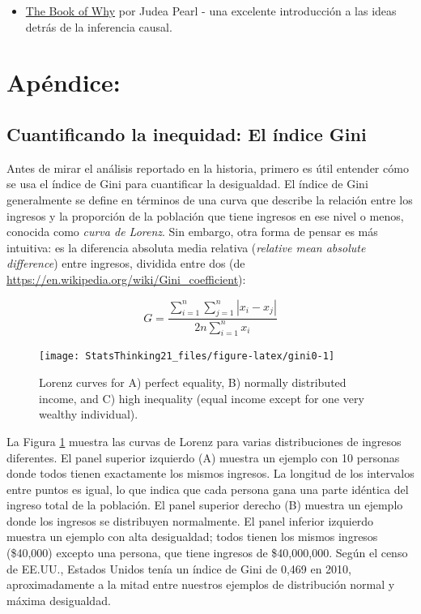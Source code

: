 \documentclass[
  12pt,
]{book}
\providecommand{\tightlist}{%
  \setlength{\itemsep}{0pt}\setlength{\parskip}{0pt}}
\begin{document}
\begin{itemize}
\tightlist
\item
  \href{http://bayes.cs.ucla.edu/WHY/}{The Book of Why} por Judea Pearl - una excelente introducción a las ideas detrás de la inferencia causal.
\end{itemize}

\hypertarget{apuxe9ndice-4}{%
\section{Apéndice:}\label{apuxe9ndice-4}}

\hypertarget{cuantificando-la-inequidad-el-uxedndice-gini}{%
\subsection{Cuantificando la inequidad: El índice Gini}\label{cuantificando-la-inequidad-el-uxedndice-gini}}

Antes de mirar el análisis reportado en la historia, primero es útil entender cómo se usa el índice de Gini para cuantificar la desigualdad. El índice de Gini generalmente se define en términos de una curva que describe la relación entre los ingresos y la proporción de la población que tiene ingresos en ese nivel o menos, conocida como \emph{curva de Lorenz}. Sin embargo, otra forma de pensar es más intuitiva: es la diferencia absoluta media relativa (\emph{relative mean absolute difference}) entre ingresos, dividida entre dos (de \url{https://en.wikipedia.org/wiki/Gini_coefficient}):

\[
G = \frac{\displaystyle{\sum_{i=1}^n \sum_{j=1}^n \left| x_i - x_j \right|}}{\displaystyle{2n\sum_{i=1}^n x_i}} 
\]

\begin{figure}
\texttt{[image: StatsThinking21\_files/figure-latex/gini0-1]} \caption{Lorenz curves for A) perfect equality, B) normally distributed income, and C) high inequality (equal income except for one very wealthy individual).}\label{fig:gini0}
\end{figure}

La Figura \ref{fig:gini0} muestra las curvas de Lorenz para varias distribuciones de ingresos diferentes. El panel superior izquierdo (A) muestra un ejemplo con 10 personas donde todos tienen exactamente los mismos ingresos. La longitud de los intervalos entre puntos es igual, lo que indica que cada persona gana una parte idéntica del ingreso total de la población. El panel superior derecho (B) muestra un ejemplo donde los ingresos se distribuyen normalmente. El panel inferior izquierdo muestra un ejemplo con alta desigualdad; todos tienen los mismos ingresos (\$40,000) excepto una persona, que tiene ingresos de \$40,000,000. Según el censo de EE.UU., Estados Unidos tenía un índice de Gini de 0,469 en 2010, aproximadamente a la mitad entre nuestros ejemplos de distribución normal y máxima desigualdad.
\end{document}
